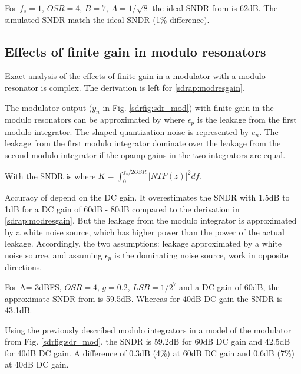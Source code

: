 For $f_s=1$,
$OSR=4$, $B=7$, $A=1/\sqrt{8}$ the ideal SNDR from  is
62dB. The simulated SNDR match the 
ideal SNDR (1\% difference). 

\subsection{Effects of finite gain in modulo resonators}
Exact analysis of the effects of finite gain in a modulator with a modulo resonator
is complex. The derivation is left for \myappname \ref{sdrap:modresgain}. 

The modulator output
($y_n$ in Fig. \ref{sdrfig:sdr_mod})
 with finite gain in the modulo resonators can be approximated by
where $\epsilon_p$ is the leakage from the first modulo integrator. The shaped quantization noise is
represented by $e_n$. 
The leakage from the first modulo integrator dominate over the leakage from
the second modulo integrator if the opamp gains in the two
integrators are equal. 


With  the SNDR is 
where $K = \int_0^{f_s/2OSR}|NTF(z)|^2df$. 

Accuracy of
 depend on the DC gain. It overestimates the SNDR with
1.5dB to 1dB for a DC gain of 60dB - 80dB compared to the
derivation in \myappname \ref{sdrap:modresgain}. But the leakage from the  modulo integrator
is approximated by a white noise source, which  has higher
power than the  power of the actual leakage. Accordingly, the two assumptions: leakage
approximated by a
white noise source, and assuming $\epsilon_p$ is the dominating noise
source, work in opposite directions.

 For
A=-3dBFS, $OSR=4$, $g=0.2$, $LSB=1/2^7$ and a DC gain of
60dB, the approximate SNDR from 
 is 59.5dB. Whereas for 40dB DC gain the SNDR is
43.1dB. 

Using the previously described modulo integrators in a \simulink
model of
the modulator from Fig. \ref{sdrfig:sdr_mod}, the SNDR is 59.2dB for
60dB DC gain and
42.5dB  for 40dB DC gain. A difference of 0.3dB (4\%) at 60dB DC
gain and 0.6dB (7\%) at 40dB DC gain.


